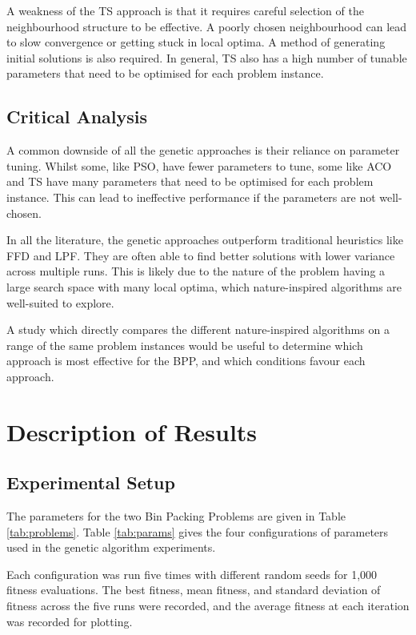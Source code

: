 \documentclass[conference]{IEEEtran}
\begin{document}
A weakness of the TS approach is that it requires careful selection of the neighbourhood structure to be effective. A poorly chosen neighbourhood can lead to slow convergence or getting stuck in local optima. A method of generating initial solutions is also required. In general, TS also has a high number of tunable parameters that need to be optimised for each problem instance.

\subsection{Critical Analysis}
A common downside of all the genetic approaches is their reliance on parameter tuning. Whilst some, like PSO, have fewer parameters to tune, some like ACO and TS have many parameters that need to be optimised for each problem instance. This can lead to ineffective performance if the parameters are not well-chosen.

In all the literature, the genetic approaches outperform traditional heuristics like FFD and LPF. They are often able to find better solutions with lower variance across multiple runs. This is likely due to the nature of the problem having a large search space with many local optima, which nature-inspired algorithms are well-suited to explore.

A study which directly compares the different nature-inspired algorithms on a range of the same problem instances would be useful to determine which approach is most effective for the BPP, and which conditions favour each approach.

\section{Description of Results}
\subsection{Experimental Setup}
The parameters for the two Bin Packing Problems are given in Table \ref{tab:problems}. Table \ref{tab:params} gives the four configurations of parameters used in the genetic algorithm experiments.

Each configuration was run five times with different random seeds for 1,000 fitness evaluations. The best fitness, mean fitness, and standard deviation of fitness across the five runs were recorded, and the average fitness at each iteration was recorded for plotting.
\end{document}
